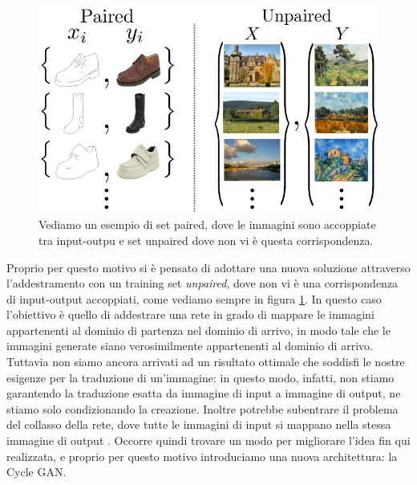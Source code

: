 \begin{figure}[H]
  \begin{center}
    \includegraphics[width=0.8\columnwidth]{images/Paired-training-data-left-consists-of-training-examples-x-i-y-i-N-i1-where-the.png}
  \end{center}
  \caption{Vediamo un esempio di set paired, dove le immagini sono accoppiate tra input-outpu e set unpaired dove non vi è questa corrispondenza.}
  \label{fig:Paired and Unpaired training set}
\end{figure}
Proprio per questo motivo si è pensato di adottare una nuova soluzione attraverso l'addestramento con un training set \emph{unpaired}, dove non vi è una corrispondenza di input-output accoppiati, come vediamo sempre in figura \ref{fig:Paired and Unpaired training set}. In questo caso l'obiettivo è quello di addestrare una rete in grado di mappare le immagini appartenenti al dominio di partenza nel dominio di arrivo, in modo tale che le immagini generate siano verosimilmente appartenenti al dominio di arrivo.
\\Tuttavia non siamo ancora arrivati ad un risultato ottimale che soddisfi le nostre esigenze per la traduzione di un'immagine: in questo modo, infatti, non stiamo garantendo la traduzione esatta da immagine di input a immagine di output, ne stiamo solo condizionando la creazione. Inoltre potrebbe subentrare il problema del collasso della rete, dove tutte le immagini di input si mappano nella stessa immagine di output \cite{Zhu_2017_ICCV}.
Occorre quindi trovare un modo per migliorare l'idea fin qui realizzata, e proprio per questo motivo introduciamo una nuova architettura: la Cycle GAN.

